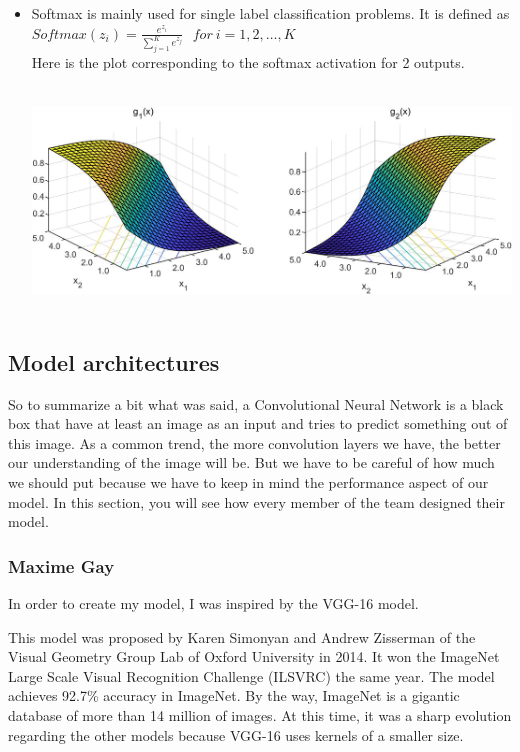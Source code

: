 \documentclass[12pt]{article}
\begin{document}
\begin{itemize}
\newpage

\item Softmax is mainly used for single label classification problems. It is defined as $ Softmax(z_i) = \frac{e^{z_{i}}}{\sum_{j=1}^K e^{z_{j}}} \ \ \ for\ i=1,2,\dots,K$ \\
Here is the plot corresponding to the softmax activation for 2 outputs. \\
\centerline{\includegraphics[height=6cm]{../../docs/softmax.png}}

\end{itemize}

\subsection{Model architectures}

So to summarize a bit what was said, a Convolutional Neural Network is a black box that have at least an image as an input and tries to predict something out of this image. As a common trend, the more convolution layers we have, the better our understanding of the image will be. But we have to be careful of how much we should put because we have to keep in mind the performance aspect of our model. In this section, you will see how every member of the team designed their model. \\

\subsubsection{Maxime Gay}
In order to create my model, I was inspired by the VGG-16 model.

This model was proposed by Karen Simonyan and Andrew Zisserman of the Visual Geometry Group Lab of Oxford University in 2014. It won the ImageNet Large Scale Visual Recognition Challenge (ILSVRC) the same year. The model achieves 92.7\% accuracy in ImageNet. By the way, ImageNet is a gigantic database of more than 14 million of images. At this time, it was a sharp evolution regarding the other models because VGG-16 uses kernels of a smaller size.
\end{document}

